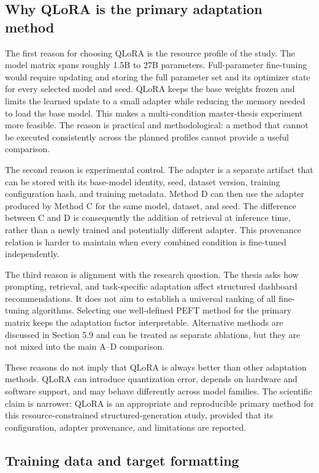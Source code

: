 \subsection{Why QLoRA is the primary adaptation method}

The first reason for choosing QLoRA is the resource profile of the study. The model matrix spans roughly 1.5B to 27B parameters. Full-parameter fine-tuning would require updating and storing the full parameter set and its optimizer state for every selected model and seed. QLoRA keeps the base weights frozen and limits the learned update to a small adapter while reducing the memory needed to load the base model. This makes a multi-condition master-thesis experiment more feasible. The reason is practical and methodological: a method that cannot be executed consistently across the planned profiles cannot provide a useful comparison.

The second reason is experimental control. The adapter is a separate artifact that can be stored with its base-model identity, seed, dataset version, training configuration hash, and training metadata. Method D can then use the adapter produced by Method C for the same model, dataset, and seed. The difference between C and D is consequently the addition of retrieval at inference time, rather than a newly trained and potentially different adapter. This provenance relation is harder to maintain when every combined condition is fine-tuned independently.

The third reason is alignment with the research question. The thesis asks how prompting, retrieval, and task-specific adaptation affect structured dashboard recommendations. It does not aim to establish a universal ranking of all fine-tuning algorithms. Selecting one well-defined PEFT method for the primary matrix keeps the adaptation factor interpretable. Alternative methods are discussed in Section 5.9 and can be treated as separate ablations, but they are not mixed into the main A--D comparison.

These reasons do not imply that QLoRA is always better than other adaptation methods. QLoRA can introduce quantization error, depends on hardware and software support, and may behave differently across model families. The scientific claim is narrower: QLoRA is an appropriate and reproducible primary method for this resource-constrained structured-generation study, provided that its configuration, adapter provenance, and limitations are reported.

\subsection{Training data and target formatting}

